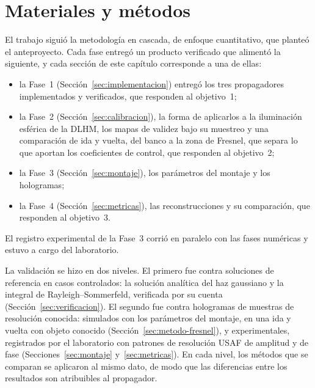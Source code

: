 \chapter{Materiales y métodos}
\label{cap:metodos}

El trabajo siguió la metodología en cascada, de enfoque cuantitativo, que
planteó el anteproyecto. Cada fase entregó un producto verificado que alimentó
la siguiente, y cada sección de este capítulo corresponde a una de ellas:
\begin{itemize}
  \item la Fase~1 (Sección~\ref{sec:implementacion}) entregó los tres
  propagadores implementados y verificados, que responden al objetivo~1;
  \item la Fase~2 (Sección~\ref{sec:calibracion}), la forma de aplicarlos a la
  iluminación esférica de la DLHM, los mapas de validez bajo su muestreo y una
  comparación de ida y vuelta, del banco a la zona de Fresnel, que separa lo
  que aportan los coeficientes de control, que responden al objetivo~2;
  \item la Fase~3 (Sección~\ref{sec:montaje}), los parámetros del montaje y los
  hologramas;
  \item la Fase~4 (Sección~\ref{sec:metricas}), las reconstrucciones y su
  comparación, que responden al objetivo~3.
\end{itemize}
El registro experimental de la Fase~3 corrió en paralelo con las fases
numéricas y estuvo a cargo del laboratorio.

La validación se hizo en dos niveles. El primero fue contra soluciones de
referencia en casos controlados: la solución analítica del haz gaussiano y la
integral de Rayleigh--Sommerfeld, verificada por su cuenta
(Sección~\ref{sec:verificacion}). El segundo fue contra hologramas de muestras
de resolución conocida: simulados con los parámetros del montaje, en una ida
y vuelta con objeto conocido (Sección~\ref{sec:metodo-fresnel}), y
experimentales, registrados por el laboratorio con patrones de resolución
USAF de amplitud y de fase (Secciones~\ref{sec:montaje} y~\ref{sec:metricas}). En
cada nivel, los métodos que se comparan se aplicaron al mismo dato, de modo que
las diferencias entre los resultados son atribuibles al propagador.

